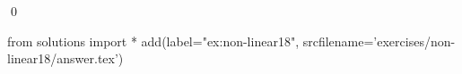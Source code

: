 
\begin{ex} 
  \label{ex:non-linear18}
  
  \qed
\end{ex} 
\begin{python0}
from solutions import *
add(label="ex:non-linear18",
    srcfilename='exercises/non-linear18/answer.tex') 
\end{python0}
